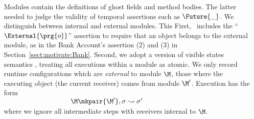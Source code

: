 % 


Modules contain the definitions of ghost fields and method bodies. The latter  needed to judge the validity of temporal assertions such as $\Future {\_}$. We distinguish between internal and external modules. This %
First, 
\Chainmail\ includes the ``$\External{\prg{o}}$'' assertion to require
that an object belongs to the external module, as in the Bank
Account's assertion (2) and (3) in
Section~\ref{sect:motivate:Bank}. Second, we adopt a version of
visible states semantics \cite{MuellerPoetzsch-HeffterLeavens06,larch93,Meyer97}, treating all
executions within a module as atomic.
We only record runtime configurations which are {\em external}
 to module $\M$, \ie those where the
 executing object (\ie the current receiver) comes from module $\M'$.
 Execution %
 has the form\\
 $~ \strut  \hspace{1.3in}    \M \mkpair  {\M'},\sigma \leadsto \sigma'$\\  
where we ignore all intermediate steps
 with receivers  internal to $\M$. 
%

